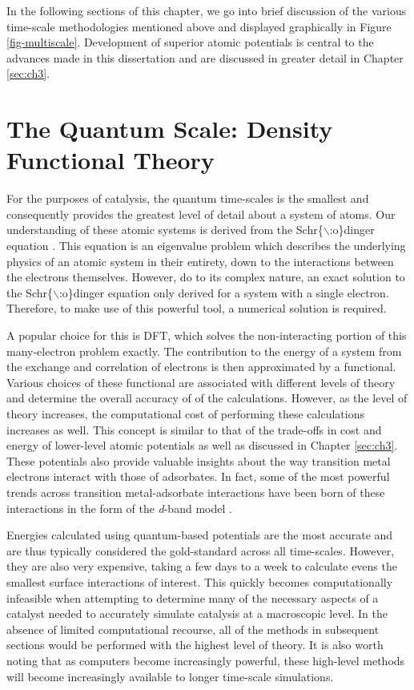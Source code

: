 \documentclass[12pt]{cmuthesis}
\begin{document}
In the following sections of this chapter, we go into brief discussion of the various time-scale methodologies mentioned above and displayed graphically in Figure \ref{fig-multiscale}. Development of superior atomic potentials is central to the advances made in this dissertation and are discussed in greater detail in Chapter \ref{sec:ch3}.

\section{The Quantum Scale: Density Functional Theory}
\label{sec:orgfef9a9e}
For the purposes of catalysis, the quantum time-scales is the smallest and consequently provides the greatest level of detail about a system of atoms. Our understanding of these atomic systems is derived from the Schr\{$\backslash$:o\}dinger equation \cite{pauling-1985-introd-quant}. This equation is an eigenvalue problem which describes the underlying physics of an atomic system in their entirety, down to the interactions between the electrons themselves. However, do to its complex nature, an exact solution to the Schr\{$\backslash$:o\}dinger equation only derived for a system with a single electron. Therefore, to make use of this powerful tool, a numerical solution is required.

A popular choice for this is DFT, which solves the non-interacting portion of this many-electron problem exactly. The contribution to the energy of a system from the exchange and correlation of electrons is then approximated by a functional. Various choices of these functional are associated with different levels of theory and determine the overall accuracy of of the calculations. However, as the level of theory increases, the computational cost of performing these calculations increases as well. This concept is similar to that of the trade-offs in cost and energy of lower-level atomic potentials as well as discussed in Chapter \ref{sec:ch3}. These potentials also provide valuable insights about the way transition metal electrons interact with those of adsorbates. In fact, some of the most powerful trends across transition metal-adsorbate interactions have been born of these interactions in the form of the \emph{d}-band model \cite{hammer-1995-why-gold,hammer-2000-theor}.

Energies calculated using quantum-based potentials are the most accurate and are thus typically considered the gold-standard across all time-scales. However, they are also very expensive, taking a few days to a week to calculate evens the smallest surface interactions of interest. This quickly becomes computationally infeasible when attempting to determine many of the necessary aspects of a catalyst needed to accurately simulate catalysis at a macroscopic level. In the absence of limited computational recourse, all of the methods in subsequent sections would be performed with the highest level of theory. It is also worth noting that as computers become increasingly powerful, these high-level methods will become increasingly available to longer time-scale simulations.
\end{document}
